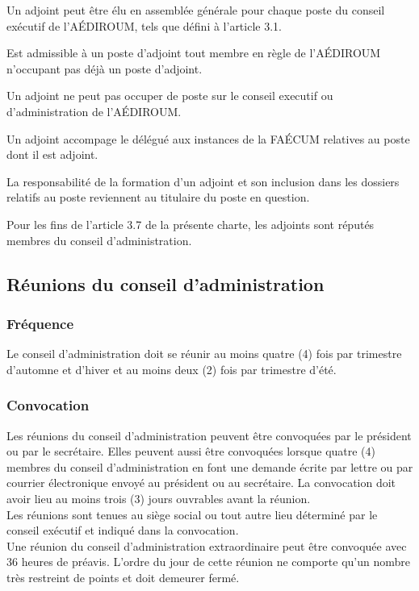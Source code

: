 \documentclass[12pt]{article}
\begin{document}
Un adjoint peut être élu en assemblée générale pour chaque poste du conseil exécutif de l’AÉDIROUM, tels que défini à l’article 3.1. 

Est admissible à un poste d’adjoint tout membre en règle de l’AÉDIROUM n’occupant pas déjà un poste d’adjoint.

Un adjoint ne peut pas occuper de poste sur le conseil executif ou d’administration de l’AÉDIROUM.

Un adjoint accompage le délégué aux instances de la FAÉCUM relatives au poste dont il est adjoint.

La responsabilité de la formation d’un adjoint et son inclusion dans les dossiers relatifs au poste reviennent au titulaire du poste en question.

Pour les fins de l’article 3.7 de la présente charte, les adjoints sont réputés membres du conseil d’administration.

\subsection{Réunions du conseil d'administration}
\subsubsection{Fréquence}

Le conseil d'administration doit se réunir au moins quatre (4) fois par trimestre d'automne et d'hiver et au moins deux (2) fois par trimestre d'été.

\subsubsection{Convocation}

Les réunions du conseil d'administration peuvent être convoquées par le président ou par le secrétaire. Elles peuvent aussi être convoquées lorsque quatre (4) membres du conseil d'administration en font une demande écrite par lettre ou par courrier électronique envoyé au président ou au secrétaire. La convocation doit avoir lieu au moins trois (3) jours ouvrables avant la réunion.\\
Les réunions sont tenues au siège social ou tout autre lieu déterminé par le conseil exécutif et indiqué dans la convocation.\\
Une réunion du conseil d'administration extraordinaire peut être convoquée avec 36 heures de préavis. L'ordre du jour de cette réunion ne comporte qu'un nombre très restreint de points et doit demeurer fermé.
\end{document}
